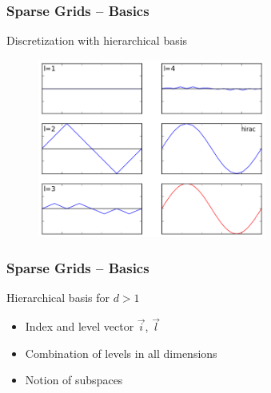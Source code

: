 \begin{frame}
  \frametitle{Sparse Grids -- Basics}
  \topline
  \vspace{-10px}
  \begin{block}{Discretization with hierarchical basis}
    \begin{figure}[!htp]
      \centering
      \includegraphics[width=7.5cm]{images/sparsegrid_1d_2}
      \vspace{-12px}
      \caption{}
    \end{figure}
  \end{block}
\end{frame}

\begin{frame}
  \frametitle{Sparse Grids -- Basics}
  \topline
  \vspace{-10px}
  \begin{block}{Hierarchical basis for $d > 1$}
    \begin{itemize}
      \item Index and level vector $\vec{i}$, $\vec{l}$
      \item Combination of levels in all dimensions
      \item Notion of subspaces
    \end{itemize}
  \end{block}
\end{frame}

